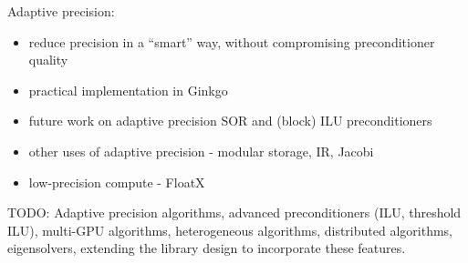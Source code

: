 

Adaptive precision:
\begin{itemize}
    \item reduce precision in a ``smart'' way, without compromising
          preconditioner quality
    \item practical implementation in Ginkgo
    \item future work on adaptive precision SOR and (block) ILU preconditioners
    \item other uses of adaptive precision - modular storage, IR, Jacobi
    \item low-precision compute - FloatX
\end{itemize}

TODO: Adaptive precision algorithms, advanced preconditioners (ILU, threshold
ILU), multi-GPU algorithms, heterogeneous algorithms, distributed algorithms,
eigensolvers, extending the library design to incorporate these features.


